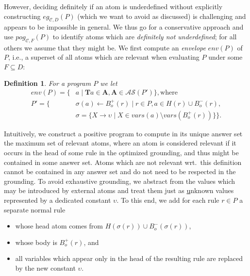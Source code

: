 \documentclass[11pt,fleqn,twoside]{article}
\newcommand{\T}{\mathbf{T}}
\newcommand{\Assignment}{\ensuremath{\mathbf{A}}}
\newcommand{\Program}{\ensuremath{P}}
\newtheorem{definition}{Definition}
\begin{document}
{			However, deciding definitely if an atom is underdefined without
			explicitly constructing $\mathit{eg}_{\mathcal{C}, D}(\Program)$ (which we want to avoid as discussed)
			is challenging and appears to be impossible in general.
			We thus go for a conservative approach and use $\mathit{pog}_{\mathcal{C}, F}(\Program)$ to identify atoms which are \emph{definitely not underdefined};
			for all others we assume that they might be.
			We first compute an \emph{envelope} $\mathit{env}(\Program)$ of $\Program$, i.e.,
			a superset of all atoms which are relevant when evaluating $\Program$ under some $F \subseteq D$:

			\begin{definition}
				For a program $\Program$ we let
				\begin{align*}
					\mathit{env}(\Program) = \{ & a \mid \T a \in \Assignment, \Assignment \in \mathcal{AS}(\Program') \}, \text{where} \\
					\Program' = \{ & \sigma(a) \leftarrow B^{+}_o(r) \mid r \in \Program, a \in H(r) \cup B^{-}_o(r), \\
									& \sigma = \{ X \rightarrow \upsilon \mid X \in \mathit{vars}(a) \setminus \mathit{vars}(B^{+}_o(r)) \} \}\text{.}
				\end{align*}
			\end{definition}
			
			Intuitively, we construct a positive program to compute in its unique answer set the maximum set of relevant atoms,
			where an atom is considered relevant if it occurs in the head of some rule in the optimized grounding, and thus might be contained in some answer set.
			Atoms which are not relevant wrt.~this definition cannot be contained in any answer set and do not need to be respected in the grounding.
			To avoid exhaustive grounding, we abstract from the values which may be introduced by external atoms and treat them just as \underline{u}nknown values represented by a dedicated constant $\upsilon$.
			To this end, we add for each rule $r \in \Program$ a separate normal rule
			\begin{itemize}
				\item whose head atom comes from $H(\sigma(r)) \cup B^{-}_o(\sigma(r))$,
				\item whose body is $B^{+}_o(r)$, and
				\item all variables which appear only in the head of the resulting rule are replaced by the new constant $\upsilon$.
			\end{itemize}
			
}
\end{document}
